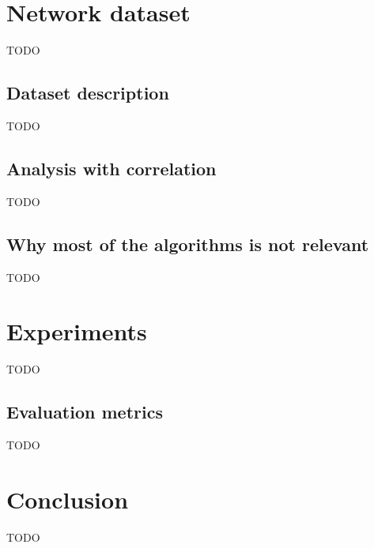 \documentclass[11pt]{article}
\begin{document}
  \section{Network dataset}
    {\color{red}TODO}
    \subsection{Dataset description}
      {\color{red}TODO}
    \subsection{Analysis with correlation}
      {\color{red}TODO}
    \subsection{Why most of the algorithms is not relevant}
      {\color{red}TODO}
  \newpage
  \section{Experiments}
    {\color{red}TODO}
    \subsection{Evaluation metrics}
      {\color{red}TODO}
  \newpage
  \section*{Conclusion}
    {\color{red}TODO}
  \newpage
  
  
\end{document}
